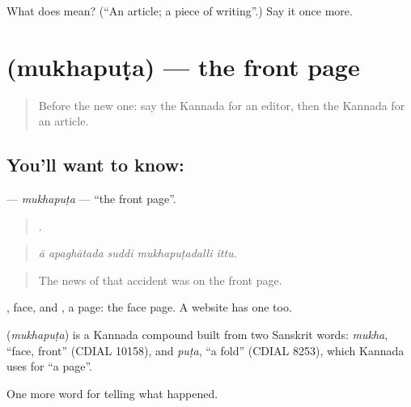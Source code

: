 \begin{tcolorbox}[breakable,colback=teal!4,colframe=teal!35!black,title={Before you move on}]
What does  mean? (\textquotedblleft{}An article; a piece of writing\textquotedblright{}.) Say it once more.
\end{tcolorbox}
\section[\texorpdfstring{\kn{ಮುಖಪುಟ} (mukhapuṭa)}{ಮುಖಪುಟ (mukhapuṭa)}]{ (mukhapuṭa) — the front page}

\label{lesson:KA-C335-mukhaputa}



\begin{quote}
Before the new one: say the Kannada for an editor, then the Kannada for an article.
\end{quote}

\subsection*{You'll want to know: }
\textbf{} — \emph{mukhapuṭa} — \textquotedblleft{}the front page\textquotedblright{}.

\begin{quote}
    .
\end{quote}

\begin{quote}
\emph{ā apaghātada suddi mukhapuṭadalli ittu.}
\end{quote}

\begin{quote}
The news of that accident was on the front page.
\end{quote}

, face, and , a page: the face page. A website has one too.

\begin{cousinweb}
\textbf{} (\emph{mukhapuṭa}) is a Kannada compound built from two Sanskrit words: \emph{mukha}, \textquotedblleft{}face, front\textquotedblright{} (CDIAL 10158), and \emph{puṭa}, \textquotedblleft{}a fold\textquotedblright{} (CDIAL 8253), which Kannada uses for \textquotedblleft{}a page\textquotedblright{}.
\end{cousinweb}

\begin{grammarlens}[title={What you've built}]
One more word for telling what happened.
\end{grammarlens}

